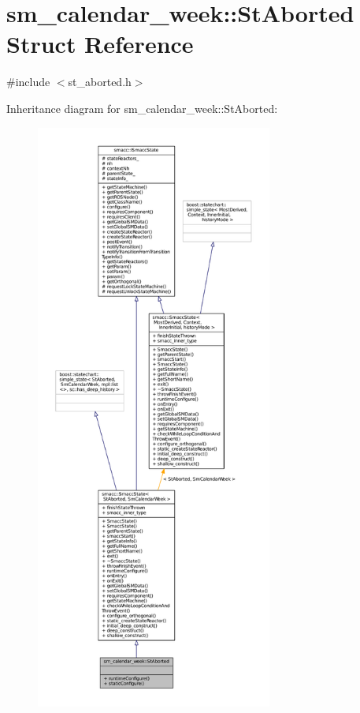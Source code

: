 \hypertarget{structsm__calendar__week_1_1StAborted}{}\section{sm\+\_\+calendar\+\_\+week\+:\+:St\+Aborted Struct Reference}
\label{structsm__calendar__week_1_1StAborted}


{\ttfamily \#include $<$st\+\_\+aborted.\+h$>$}



Inheritance diagram for sm\+\_\+calendar\+\_\+week\+:\+:St\+Aborted\+:
\nopagebreak
\begin{figure}[H]
\begin{center}
\leavevmode
\includegraphics[height=550pt]{structsm__calendar__week_1_1StAborted__inherit__graph}
\end{center}
\end{figure}


